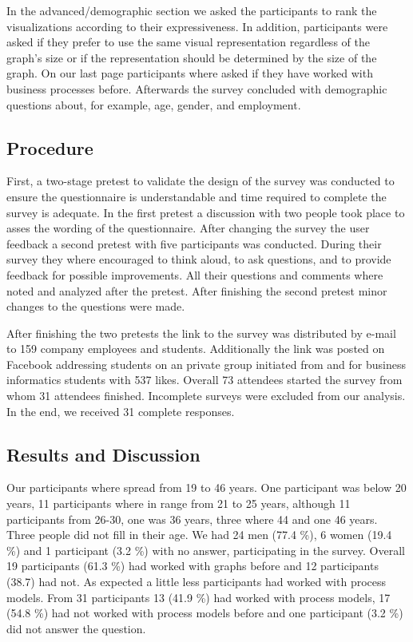 \documentclass{llncs}
\begin{document}
In the advanced/demographic section we asked the participants to rank the visualizations according to their expressiveness. In addition, participants were asked if they prefer to use the same visual representation regardless of the graph's size or if the representation should be determined by the size of the graph. On our last page participants where asked if they have worked with business processes before. Afterwards the survey concluded with demographic questions about, for example, age, gender, and employment. 

\subsection{Procedure} %
\label{sec:Procedure}

First, a two-stage pretest to validate the design of the survey was conducted to ensure the questionnaire is understandable and time required to complete the survey is adequate. In the first pretest a discussion with two people took place to asses the wording of the questionnaire. After changing the survey the user feedback a second pretest with five participants was conducted. During their survey they where encouraged to think aloud, to ask questions, and to provide feedback for possible improvements. All their questions and comments where noted and analyzed after the pretest. After finishing the second pretest minor changes to the questions were made. 

After finishing the two pretests the link to the survey was distributed by e-mail to 159 company employees and students. Additionally the link was posted on Facebook addressing students on an private group initiated from and for business informatics students with 537 likes. Overall 73 attendees started the survey from whom 31 attendees finished. Incomplete surveys were excluded from our analysis. In the end, we received 31 complete responses.

\subsection{Results and Discussion} %
\label{sec:Results}

Our participants where spread  from 19 to 46 years. One participant was below 20 years, 11 participants where in range from 21 to 25 years, although 11 participants from 26-30, one was 36 years, three where 44 and one 46 years. Three people did not fill in their age. We had 24 men (77.4 \%), 6 women (19.4 \%) and 1 participant (3.2 \%) with no answer, participating in the survey. Overall 19 participants (61.3 \%) had worked with graphs before and 12 participants (38.7) had not. As expected a little less participants had worked with process models. From 31 participants 13 (41.9 \%) had worked with process models, 17 (54.8 \%) had not worked with process models before and one participant (3.2 \%) did not answer the question.
\end{document}
